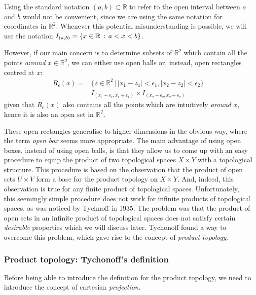 \begin{remark}
	Using the standard notation $(a,b)\subset\mathbb{R}$ to refer to the
	open interval between $a$ and $b$ would not be convenient, since we are using
	the same notation for coordinates in $\mathbb{R}^2$.
	Whenever this potential misunderstanding is possible, we will use the notation
	$I_{(a,b)} = \left\{x\in\mathbb{R}\,:\,a<x<b\right\}$.
\end{remark}

However, if our main concern is to determine subsets of $\mathbb{R}^2$ which contain all the points
\emph{around} $x\in\mathbb{R}^2$, we can either use open balls or, instead, open rectangles centred at $x$:
\begin{align*}
R_\epsilon(x) =& \{z\in\mathbb{R}^2\,|\,|x_1-z_1|<\epsilon_1, |x_2-z_2|<\epsilon_2\} \\
=& I_{(x_1-\epsilon_1, x_1+\epsilon_1)}\times I_{(x_2-\epsilon_2, x_2+\epsilon_2)}
\end{align*}
given that $R_\epsilon(x)$ also contains all the points which are intuitively \emph{around} $x$, hence it is also an
open set in $\mathbb{R}^2$.

These open rectangles generalise to higher dimensions in the obvious way, where the term \emph{open box} seems more appropriate. The main advantage of using open boxes, instead of using open balls, is that they allow us to come up with an easy procedure to equip the product of two topological spaces $X \times Y$ with a topological structure. This procedure is based on the observation that the product of open sets $U \times V$ form a base for the product topology on $X \times Y$. And, indeed, this observation is true for any finite product of topological spaces. Unfortunately, this seemingly simple procedure does not work for infinite products of topological spaces, as was noticed by Tychnoff in 1935. The problem was that the product of open sets in an infinite product of topological spaces does not satisfy certain \emph{desirable} properties which we will discuss later. Tychonoff found a way to overcome this problem, which gave rise to the concept of \emph{product topology}.

\subsubsection{Product topology: Tychonoff's definition}\label{subsubsec:product-topology}

Before being able to introduce the definition for the product topology, we need to
introduce the concept of cartesian \emph{projection}.

